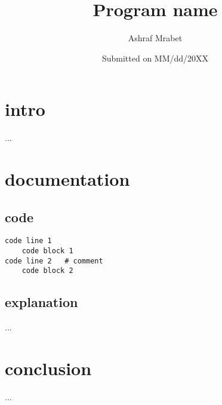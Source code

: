 \documentclass{article}
\title{\Huge Program name}
\author{Ashraf Mrabet}
\date{Submitted on MM/dd/20XX}
\begin{document}
	{\maketitle}

	\section*{intro}
	...
	\section*{documentation}
	\subsection*{code}
	\begin{lstlisting}
code line 1
	code block 1
code line 2   # comment
	code block 2
	\end{lstlisting}
	\subsection*{explanation}
	...
	\section*{conclusion}
	...
\end{document}
